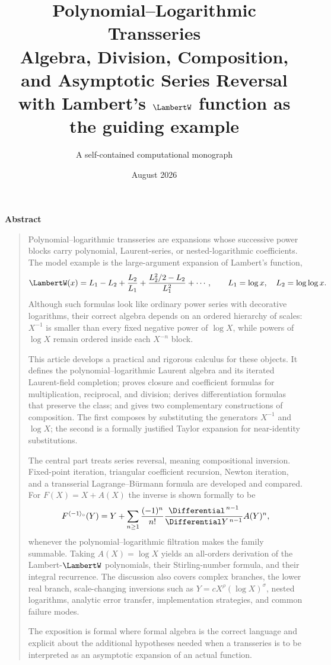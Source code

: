 \documentclass[11pt,oneside]{book}
\title{\Huge\bfseries Polynomial--Logarithmic Transseries\\[0.4em]
\Large Algebra, Division, Composition, and Asymptotic Series Reversal\\[1em]
\large with Lambert's \texorpdfstring{$\LambertW$}{W} function as the guiding example}
\author{A self-contained computational monograph}
\date{August 2026}
\theoremstyle{definition}
\theoremstyle{remark}
\newenvironment{abstract}
  {\cleardoublepage\thispagestyle{plain}\begin{center}
   {\Large\bfseries Abstract}\end{center}\begin{quote}\small}
  {\end{quote}\cleardoublepage}
\newcommand{\compinv}{^{\langle-1\rangle_{\circ}}}
\begin{document}
\frontmatter
\maketitle

\begin{abstract}
Polynomial--logarithmic transseries are expansions whose successive power
blocks carry polynomial, Laurent-series, or nested-logarithmic coefficients.
The model example is the large-argument expansion of Lambert's function,
\[
 \LambertW(x)=L_1-L_2+\frac{L_2}{L_1}
 +\frac{L_2^2/2-L_2}{L_1^2}+\cdots,
 \qquad L_1=\log x,\quad L_2=\log\log x.
\]
Although such formulas look like ordinary power series with decorative
logarithms, their correct algebra depends on an ordered hierarchy of scales:
$X^{-1}$ is smaller than every fixed negative power of $\log X$, while powers
of $\log X$ remain ordered inside each $X^{-n}$ block.

This article develops a practical and rigorous calculus for these objects.
It defines the polynomial--logarithmic Laurent algebra and its iterated
Laurent-field completion; proves closure and coefficient formulas for
multiplication, reciprocal, and division; derives differentiation formulas
that preserve the class; and gives two complementary constructions of
composition.  The first composes by substituting the generators
$X^{-1}$ and $\log X$; the second is a formally justified Taylor expansion
for near-identity substitutions.

The central part treats series reversal, meaning compositional inversion.
Fixed-point iteration, triangular coefficient recursion, Newton iteration,
and a transserial Lagrange--B\"urmann formula are developed and compared.
For $F(X)=X+A(X)$ the inverse is shown formally to be
\[
 F\compinv(Y)=Y+\sum_{n\ge1}\frac{(-1)^n}{n!}
 \frac{\Differential^{\,n-1}}{\Differential Y^{\,n-1}}A(Y)^n,
\]
whenever the polynomial--logarithmic filtration makes the family summable.
Taking $A(X)=\log X$ yields an all-orders derivation of the Lambert-$\LambertW$
polynomials, their Stirling-number formula, and their integral recurrence.
The discussion also covers complex branches, the lower real branch,
scale-changing inversions such as $Y=cX^\rho(\log X)^\sigma$, nested
logarithms, analytic error transfer, implementation strategies, and common
failure modes.

The exposition is formal where formal algebra is the correct language and
explicit about the additional hypotheses needed when a transseries is to be
interpreted as an asymptotic expansion of an actual function.
\end{abstract}
\end{document}
